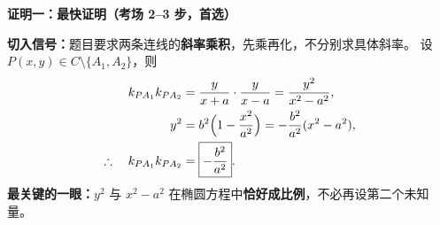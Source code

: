 \begin{proofbox}
\textbf{\textcolor{CProof}{证明一：最快证明（考场 2--3 步，首选）}}


\par\textbf{切入信号：}题目要求两条连线的\textbf{斜率乘积}，先乘再化，不分别求具体斜率。
设 $P(x,y)\in C\setminus\{A_1,A_2\}$，则
\[
 \begin{aligned}
 k_{PA_1}k_{PA_2}
 &=\frac{y}{x+a}\cdot\frac{y}{x-a}
 =\frac{y^2}{x^2-a^2},\\
 y^2&=b^2\Bigl(1-\frac{x^2}{a^2}\Bigr)
 =-\frac{b^2}{a^2}(x^2-a^2),\\
 \therefore\quad k_{PA_1}k_{PA_2}&=\boxed{-\frac{b^2}{a^2}}.
 \end{aligned}
\]
\textbf{最关键的一眼：}$y^2$ 与 $x^2-a^2$ 在椭圆方程中\textbf{恰好成比例}，不必再设第二个未知量。

\end{proofbox}
\clearpage
